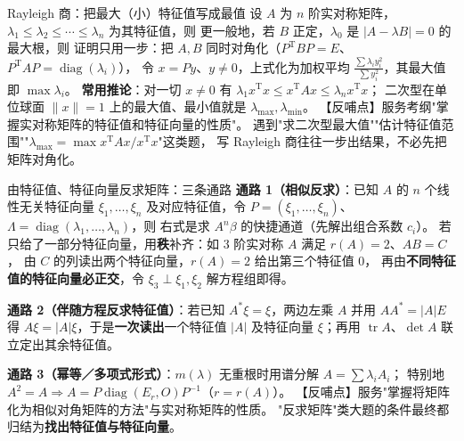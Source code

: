 \begin{fdeep}{Rayleigh 商：把最大（小）特征值写成最值}
设 $A$ 为 $n$ 阶实对称矩阵，$\lambda_1\le\lambda_2\le\cdots\le\lambda_n$ 为其特征值，则
更一般地，若 $B$ 正定，$\lambda_0$ 是 $\lvert A-\lambda B\rvert=0$ 的最大根，则
证明只用一步：把 $A,B$ 同时对角化（$P^{\mathrm T}BP=E$、$P^{\mathrm T}AP=\operatorname{diag}(\lambda_i)$），
令 $x=Py$、$y\ne0$，上式化为加权平均
$\frac{\sum\lambda_iy_i^{2}}{\sum y_i^{2}}$，其最大值即 $\max\lambda_i$。
\textbf{常用推论}：对一切 $x\ne0$ 有 $\lambda_1x^{\mathrm T}x\le x^{\mathrm T}Ax\le\lambda_nx^{\mathrm T}x$；
二次型在单位球面 $\lVert x\rVert=1$ 上的最大值、最小值就是 $\lambda_{\max},\lambda_{\min}$。
【反哺点】服务考纲"掌握实对称矩阵的特征值和特征向量的性质"。
遇到"求二次型最大值""估计特征值范围""$\lambda_{\max}=\max x^{\mathrm T}Ax/x^{\mathrm T}x$"这类题，
写 Rayleigh 商往往一步出结果，不必先把矩阵对角化。
\end{fdeep}

\begin{fdeep}{由特征值、特征向量反求矩阵：三条通路}
\textbf{通路 1（相似反求）}：已知 $A$ 的 $n$ 个线性无关特征向量 $\xi_1,\dots,\xi_n$
及对应特征值，令 $P=(\xi_1,\dots,\xi_n)$、$\Lambda=\operatorname{diag}(\lambda_1,\dots,\lambda_n)$，则
右式是求 $A^{n}\beta$ 的快捷通道（先解出组合系数 $c_i$）。
若只给了一部分特征向量，用\textbf{秩}补齐：如 $3$ 阶实对称 $A$ 满足 $r(A)=2$、$AB=C$，
由 $C$ 的列读出两个特征向量，$r(A)=2$ 给出第三个特征值 $0$，
再由\textbf{不同特征值的特征向量必正交}，令 $\xi_3\perp\xi_1,\xi_2$ 解方程组即得。

\textbf{通路 2（伴随方程反求特征值）}：若已知 $A^{*}\xi=\xi$，两边左乘 $A$ 并用
$AA^{*}=\lvert A\rvert E$ 得 $A\xi=\lvert A\rvert\xi$，于是\textbf{一次读出}一个特征值 $\lvert A\rvert$
及特征向量 $\xi$；再用 $\operatorname{tr}A$、$\det A$ 联立定出其余特征值。

\textbf{通路 3（幂等／多项式形式）}：$m(\lambda)$ 无重根时用谱分解 $A=\sum\lambda_iA_i$；
特别地 $A^{2}=A\Rightarrow A=P\operatorname{diag}(E_r,O)P^{-1}$（$r=r(A)$）。
【反哺点】服务"掌握将矩阵化为相似对角矩阵的方法"与实对称矩阵的性质。
"反求矩阵"类大题的条件最终都归结为\textbf{找出特征值与特征向量}。
\end{fdeep}

